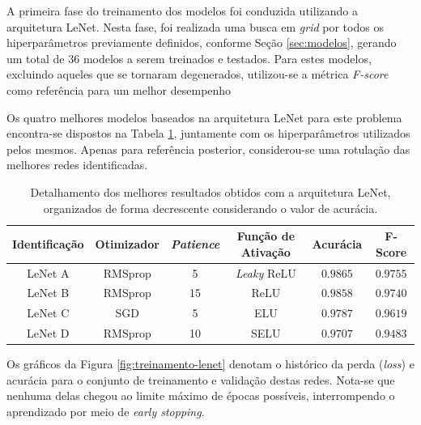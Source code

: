 

A primeira fase do treinamento dos modelos foi conduzida utilizando a arquitetura LeNet. Nesta fase, foi realizada uma busca em \emph{grid} por todos os hiperparâmetros previamente definidos, conforme Seção \ref{sec:modelos}, gerando um total de $36$ modelos a serem treinados e testados. Para estes modelos, excluindo aqueles que se tornaram degenerados, utilizou-se a métrica \emph{F-score} como referência para um melhor desempenho

Os quatro melhores modelos baseados na arquitetura LeNet para este problema encontra-se dispostos na Tabela \ref{tab:lenet}, juntamente com os hiperparâmetros utilizados pelos mesmos. Apenas para referência posterior, considerou-se uma rotulação das melhores redes identificadas.

\begin{table}[h]
\centering
\caption{Detalhamento dos melhores resultados obtidos com a arquitetura LeNet, organizados de forma decrescente considerando o valor de acurácia.}
\label{tab:lenet}
\begin{tabular}{cccccc}
\toprule
\textbf{Identificação} & \textbf{Otimizador} & \textbf{\emph{Patience}}  & \textbf{Função de Ativação} & \textbf{Acurácia} & \textbf{F-Score} \\
\midrule
LeNet A & RMSprop & 5 & \emph{Leaky} ReLU & $0.9865$ & $0.9755$ \\
LeNet B & RMSprop & 15 & ReLU & $0.9858$ & $0.9740$\\
LeNet C & SGD & 5 & ELU & $0.9787$ & $0.9619$ \\
LeNet D & RMSprop & 10 & SELU & $0.9707$ & $0.9483$ \\
\bottomrule
\end{tabular}
\end{table}


Os gráficos da Figura \ref{fig:treinamento-lenet} denotam o histórico da perda (\emph{loss}) e acurácia para o conjunto de treinamento e validação destas redes. Nota-se que nenhuma delas chegou ao limite máximo de épocas possíveis, interrompendo o aprendizado por meio de \emph{early stopping}.

